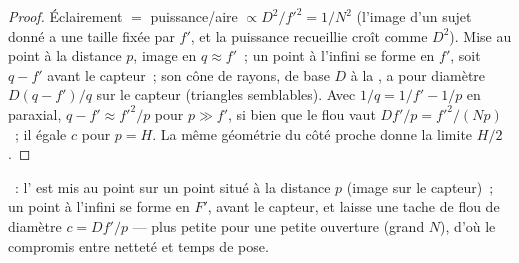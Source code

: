\begin{proof}
Éclairement $=$ puissance/aire $\propto D^2/f'^2 = 1/N^2$ (l'image d'un
sujet donné a une taille fixée par $f'$, et la puissance recueillie
croît comme $D^2$). Mise au point à la distance $p$, image en
$q \approx f'$~; un point à l'infini se forme en $f'$, soit $q - f'$
avant le capteur~; son cône de rayons, de base $D$ à la , a pour
diamètre $D(q - f')/q$ sur le capteur (triangles semblables). Avec
$1/q = 1/f' - 1/p$ en paraxial, $q - f' \approx f'^2/p$ pour $p \gg f'$,
si bien que le flou vaut $Df'/p = f'^2/(Np)$~; il égale $c$ pour
$p = H$. La même géométrie du côté proche donne la limite $H/2$.
\end{proof}

\begin{omfigure}

{\small {}~: l' est mis au point sur un point
situé à la distance $p$ (image sur le capteur)~; un point à l'infini se
forme en $F'$, avant le capteur, et laisse une tache de flou de diamètre
$c = Df'/p$ --- plus petite pour une petite ouverture (grand $N$), d'où
le compromis entre netteté et temps de pose.}
\end{omfigure}

